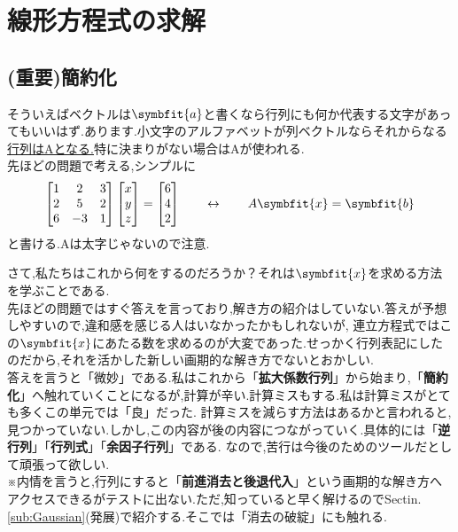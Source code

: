 \section{線形方程式の求解}
\subsection{(重要)簡約化}
そういえばベクトルは$\symbfit{a}$と書くなら行列にも何か代表する文字があってもいいはず.あります.小文字のアルファベットが列ベクトルならそれからなる\underline{行列はAとなる.}特に決まりがない場合はAが使われる.\\
先ほどの問題で考える,シンプルに
\begin{equation}\label{eq:Ax_b}
\begin{bmatrix}
    1 & 2 & 3 \\
    2 & 5 & 2 \\
    6 & -3 & 1
\end{bmatrix}
\begin{bmatrix}
    x \\ y \\ z
\end{bmatrix}
=
\begin{bmatrix}
    6 \\ 4 \\ 2
\end{bmatrix}
\qquad \leftrightarrow \qquad A\symbfit{x} = \symbfit{b}
\end{equation}
と書ける.Aは太字じゃないので注意.

さて,私たちはこれから何をするのだろうか？それは$\symbfit{x}$を求める方法を学ぶことである.\\
先ほどの問題ではすぐ答えを言っており,解き方の紹介はしていない.答えが予想しやすいので,違和感を感じる人はいなかったかもしれないが,
連立方程式ではこの$\symbfit{x}$にあたる数を求めるのが大変であった.せっかく行列表記にしたのだから,それを活かした新しい画期的な解き方でないとおかしい.\\
答えを言うと「微妙」である.私はこれから「\textbf{拡大係数行列}」から始まり,「\textbf{簡約化}」へ触れていくことになるが,計算が辛い.計算ミスもする.私は計算ミスがとても多くこの単元では「良」だった.
計算ミスを減らす方法はあるかと言われると,見つかっていない.しかし,この内容が後の内容につながっていく.具体的には「\textbf{逆行列}」「\textbf{行列式}」「\textbf{余因子行列}」である.
なので,苦行は今後のためのツールだとして頑張って欲しい.\\
※内情を言うと,行列にすると「\textbf{前進消去と後退代入}」という画期的な解き方へアクセスできるがテストに出ない.ただ,知っていると早く解けるのでSectin.\ref{sub:Gaussian}(発展)で紹介する.そこでは「消去の破綻」にも触れる.\\
\\

